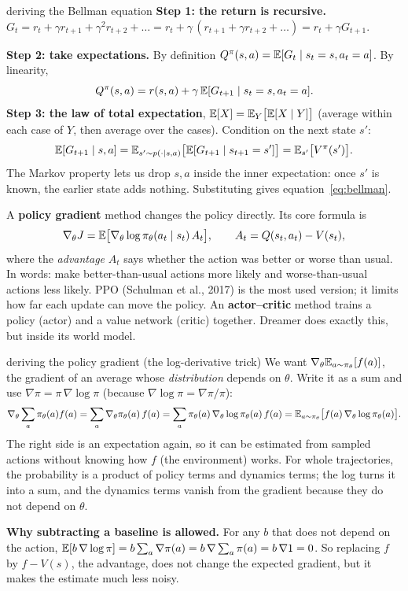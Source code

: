 \begin{probbox}{deriving the Bellman equation}
\textbf{Step 1: the return is recursive.} $G_t=r_t+\gamma r_{t+1}+\gamma^2r_{t+2}+\dots=r_t+\gamma\,(r_{t+1}+\gamma r_{t+2}+\dots)=r_t+\gamma G_{t+1}$.

\textbf{Step 2: take expectations.} By definition $Q^\pi(s,a)=\mathbb{E}[G_t\mid s_t=s,a_t=a]$. By linearity,
\[
Q^\pi(s,a)=r(s,a)+\gamma\,\mathbb{E}[G_{t+1}\mid s_t=s,a_t=a].
\]
\textbf{Step 3: the law of total expectation}, $\mathbb{E}[X]=\mathbb{E}_Y\big[\mathbb{E}[X\mid Y]\big]$ (average within each case of $Y$, then average over the cases). Condition on the next state $s'$:
\[
\mathbb{E}[G_{t+1}\mid s,a]=\mathbb{E}_{s'\sim p(\cdot\mid s,a)}\big[\mathbb{E}[G_{t+1}\mid s_{t+1}=s']\big]=\mathbb{E}_{s'}\big[V^\pi(s')\big].
\]
The Markov property lets us drop $s,a$ inside the inner expectation: once $s'$ is known, the earlier state adds nothing. Substituting gives equation~\eqref{eq:bellman}.
\end{probbox}

A \textbf{policy gradient} method changes the policy directly. Its core formula is
\begin{equation}
\nabla_\theta J=\mathbb{E}\big[\nabla_\theta\log\pi_\theta(a_t\mid s_t)\,A_t\big],\qquad A_t=Q(s_t,a_t)-V(s_t),
\end{equation}
where the \emph{advantage} $A_t$ says whether the action was better or worse than usual. In words: make better-than-usual actions more likely and worse-than-usual actions less likely. PPO (Schulman et al., 2017) is the most used version; it limits how far each update can move the policy. An \textbf{actor--critic} method trains a policy (actor) and a value network (critic) together. Dreamer does exactly this, but inside its world model.

\begin{probbox}{deriving the policy gradient (the log-derivative trick)}
We want $\nabla_\theta\mathbb{E}_{a\sim\pi_\theta}[f(a)]$, the gradient of an average whose \emph{distribution} depends on $\theta$. Write it as a sum and use $\nabla\pi=\pi\,\nabla\log\pi$ (because $\nabla\log\pi=\nabla\pi/\pi$):
\[
\nabla_\theta\sum_a\pi_\theta(a)f(a)=\sum_a\nabla_\theta\pi_\theta(a)\,f(a)=\sum_a\pi_\theta(a)\,\nabla_\theta\log\pi_\theta(a)\,f(a)=\mathbb{E}_{a\sim\pi_\theta}\big[f(a)\,\nabla_\theta\log\pi_\theta(a)\big].
\]
The right side is an expectation again, so it can be estimated from sampled actions without knowing how $f$ (the environment) works. For whole trajectories, the probability is a product of policy terms and dynamics terms; the log turns it into a sum, and the dynamics terms vanish from the gradient because they do not depend on $\theta$.

\textbf{Why subtracting a baseline is allowed.} For any $b$ that does not depend on the action,
$\mathbb{E}[b\,\nabla\log\pi]=b\sum_a\nabla\pi(a)=b\,\nabla\sum_a\pi(a)=b\,\nabla1=0$. So replacing $f$ by $f-V(s)$, the advantage, does not change the expected gradient, but it makes the estimate much less noisy.
\end{probbox}

